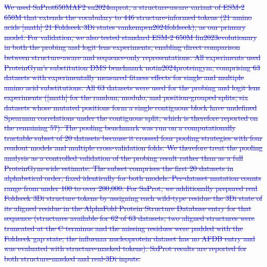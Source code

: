 \documentclass[11pt,a4paper]{article}
\begin{document}
\textcolor{blue}{\sout{We used SaProt650MAF2 su2024saprot, a structure-aware variant of ESM-2 650M
that extends the vocabulary to 446 structure-informed tokens (21 amino acids [math] 21
Foldseek 3Di states vankempen2024foldseek), as our primary model. For validation,
we also tested standard ESM-2 650M lin2023evolutionary in both the probing and
logit lens experiments, enabling direct comparison between structure-aware and
sequence-only representations. All experiments used ProteinGym's substitution DMS
benchmark notin2024proteingym, comprising 63 datasets with experimentally measured
fitness effects for single and multiple amino acid substitutions. All 63 datasets
were used for the probing and logit lens experiments ([math] for the random, modulo, and
position-grouped splits; six datasets whose mutated positions form a single contiguous
block have undefined Spearman correlations under the contiguous split, which is therefore
reported on the remaining 57). The pooling benchmark was run on a computationally tractable subset of
20 datasets because it crossed four pooling strategies with four readout models and
multiple cross-validation folds. We therefore treat the pooling analysis as a
controlled validation of the probing result rather than as a full ProteinGym-wide
estimate. The subset comprises the first 20 datasets in alphabetical order,
fixed identically for both models. Per-dataset mutation counts range from under 100 to over 200,000.
For SaProt, we additionally prepared real Foldseek 3Di structure tokens by
assigning each wild-type residue the 3Di state of its aligned residue in the
AlphaFold Protein Structure Database entry for that sequence (structures available for
62 of 63 datasets; two aligned structures were truncated at the C terminus and the
missing residues were padded with the Foldseek gap state; the influenza nucleoprotein
dataset has no AFDB entry and was evaluated with structure-masked tokens). SaProt
results are reported for both structure-masked and real-3Di inputs.}}
\end{document}
